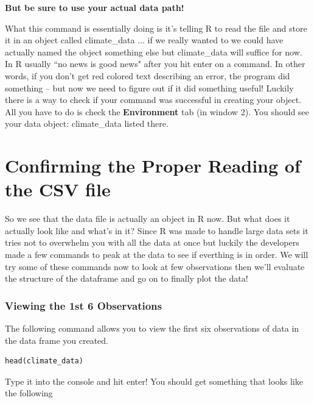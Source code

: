 \documentclass{article}\usepackage[]{graphicx}\usepackage[]{color}
\begin{document}
\textbf{But be sure to use your actual data path!}

What this command is essentially doing is it's telling R to read the file and store it in an object called climate\_data ... if we really wanted to we could have actually named the object something else but climate\_data will suffice for now. \\ 

In R usually ``no news is good news" after you hit enter on a command. In other words, if you don't get red colored text describing an error, the program did something -- but now we need to figure out if it did something useful! Luckily there is a way to check if your command was successful in creating your object. All you have to do is check the \textbf{Environment} tab (in window 2). You should see your data object: climate\_data listed there. 


\section{Confirming the Proper Reading of the CSV file}


So we see that the data file is actually an object in R now. But what does it actually look like and what's in it? 
Since R was made to handle large data sets it tries not to overwhelm you with all the data at once but luckily the developers made a few commands to peak at the data to see if everthing is in order. We will try some of these commands now to look at few observations then we'll evaluate the structure of the dataframe and go on to finally plot the data!

\subsubsection{Viewing the 1st 6 Observations}
The following command allows you to view the first six observations of data in the data frame you created.
\begin{verbatim}
head(climate_data)
\end{verbatim}
Type it into the console and hit enter! You should get something that looks like the following
\end{document}
